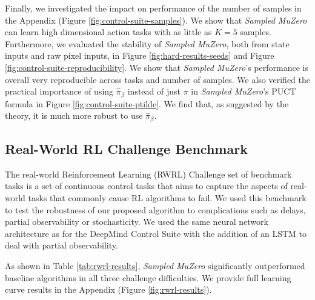 \documentclass{article}
\newcommand{\smuzero}{\emph{Sampled MuZero}}
\newcommand{\sample}{\beta}
\newcommand{\dmcs}{DeepMind Control Suite }
\newcommand{\rwrl}{Real-World RL }
\begin{document}
Finally, we investigated the impact on performance of the number of samples in the Appendix (Figure \ref{fig:control-suite-samples}). We show that \smuzero{} can learn high dimensional action tasks with as little as $K=5$ samples. Furthermore, we evaluated the stability of \smuzero{}, both from state inputs and raw pixel inputs, in Figure \ref{fig:hard-results-seeds} and Figure \ref{fig:control-suite-reproducibility}. We show that \smuzero{}'s performance is overall very reproducible across tasks and number of samples. We also verified the practical importance of using $\hat{\pi}_\sample$ instead of just $\pi$ in \smuzero{}'s PUCT formula in Figure \ref{fig:control-suite-ptilde}. We find that, as suggested by the theory, it is much more robust to use $\hat{\pi}_\sample$.

\subsection{\rwrl Challenge Benchmark}

The real-world Reinforcement Learning (RWRL) Challenge set of benchmark tasks \cite{dulacarnold2020empirical} is a set of continuous control tasks that aims to capture the aspects of real-world tasks that commonly cause RL algorithms to fail. We used this benchmark to test the robustness of our proposed algorithm to complications such as delays, partial observability or stochasticity. We used the same neural network architecture as for the \dmcs with the addition of an LSTM \cite{lstm} to deal with partial observability.

As shown in Table \ref{tab:rwrl-results}, \smuzero{} significantly outperformed baseline algorithms in all three challenge difficulties. We provide full learning curve results in the Appendix (Figure \ref{fig:rwrl-results}).
\end{document}
